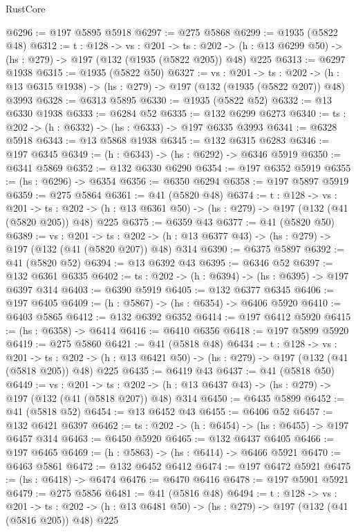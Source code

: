 \begin{lexlean}{RustCore}
\begin{coremodule}
@6296 := @197 @5895 @5918
@6297 := @275 @5868
@6299 := @1935 (@5822 @48)
@6312 := {t : @128} ->
  {vs : @201} ->
  {ts : @202} -> (h : @13 @6299 @50) -> (hs : @279) -> @197 (@132 (@1935 (@5822 @205)) @48) @225
@6313 := @6297 @1938
@6315 := @1935 (@5822 @50)
@6327 := {vs : @201} ->
  {ts : @202} -> (h : @13 @6315 @1938) -> (hs : @279) -> @197 (@132 (@1935 (@5822 @207)) @48) @3993
@6328 := @6313 @5895
@6330 := @1935 (@5822 @52)
@6332 := @13 @6330 @1938
@6333 := @6284 @52
@6335 := @132 @6299 @6273
@6340 := {ts : @202} -> (h : @6332) -> (hs : @6333) -> @197 @6335 @3993
@6341 := @6328 @5918
@6343 := @13 @5868 @1938
@6345 := @132 @6315 @6283
@6346 := @197 @6345
@6349 := (h : @6343) -> (hs : @6292) -> @6346 @5919
@6350 := @6341 @5869
@6352 := @132 @6330 @6290
@6354 := @197 @6352 @5919
@6355 := (hs : @6296) -> @6354
@6356 := @6350 @6294
@6358 := @197 @5897 @5919
@6359 := @275 @5864
@6361 := @41 (@5820 @48)
@6374 := {t : @128} ->
  {vs : @201} ->
  {ts : @202} -> (h : @13 @6361 @50) -> (hs : @279) -> @197 (@132 (@41 (@5820 @205)) @48) @225
@6375 := @6359 @43
@6377 := @41 (@5820 @50)
@6389 := {vs : @201} ->
  {ts : @202} -> (h : @13 @6377 @43) -> (hs : @279) -> @197 (@132 (@41 (@5820 @207)) @48) @314
@6390 := @6375 @5897
@6392 := @41 (@5820 @52)
@6394 := @13 @6392 @43
@6395 := @6346 @52
@6397 := @132 @6361 @6335
@6402 := {ts : @202} -> (h : @6394) -> (hs : @6395) -> @197 @6397 @314
@6403 := @6390 @5919
@6405 := @132 @6377 @6345
@6406 := @197 @6405
@6409 := (h : @5867) -> (hs : @6354) -> @6406 @5920
@6410 := @6403 @5865
@6412 := @132 @6392 @6352
@6414 := @197 @6412 @5920
@6415 := (hs : @6358) -> @6414
@6416 := @6410 @6356
@6418 := @197 @5899 @5920
@6419 := @275 @5860
@6421 := @41 (@5818 @48)
@6434 := {t : @128} ->
  {vs : @201} ->
  {ts : @202} -> (h : @13 @6421 @50) -> (hs : @279) -> @197 (@132 (@41 (@5818 @205)) @48) @225
@6435 := @6419 @43
@6437 := @41 (@5818 @50)
@6449 := {vs : @201} ->
  {ts : @202} -> (h : @13 @6437 @43) -> (hs : @279) -> @197 (@132 (@41 (@5818 @207)) @48) @314
@6450 := @6435 @5899
@6452 := @41 (@5818 @52)
@6454 := @13 @6452 @43
@6455 := @6406 @52
@6457 := @132 @6421 @6397
@6462 := {ts : @202} -> (h : @6454) -> (hs : @6455) -> @197 @6457 @314
@6463 := @6450 @5920
@6465 := @132 @6437 @6405
@6466 := @197 @6465
@6469 := (h : @5863) -> (hs : @6414) -> @6466 @5921
@6470 := @6463 @5861
@6472 := @132 @6452 @6412
@6474 := @197 @6472 @5921
@6475 := (hs : @6418) -> @6474
@6476 := @6470 @6416
@6478 := @197 @5901 @5921
@6479 := @275 @5856
@6481 := @41 (@5816 @48)
@6494 := {t : @128} ->
  {vs : @201} ->
  {ts : @202} -> (h : @13 @6481 @50) -> (hs : @279) -> @197 (@132 (@41 (@5816 @205)) @48) @225

\end{coremodule}
\end{lexlean}
